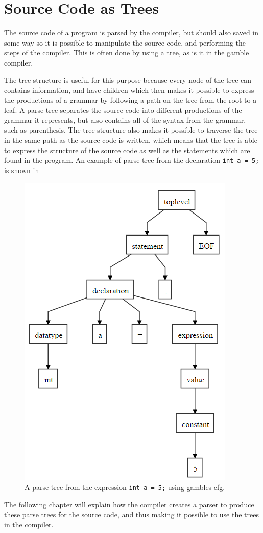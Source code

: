 \section{Source Code as Trees}\label{SourceCodeAsTrees}
The source code of a program is parsed by the compiler, but should also saved in some way so it is possible to manipulate the source code, and performing the steps of the compiler.
This is often done by using a tree, as is it in the \gls{gamble} compiler.

The tree structure is useful for this purpose because every node of the tree can contains information, and have children which then makes it possible to express the productions of a grammar by following a path on the tree from the root to a leaf.
A parse tree separates the source code into different productions of the grammar it represents, but also contains all of the syntax from the grammar, such as parenthesis.
The tree structure also makes it possible to traverse the tree in the same path as the source code is written, which means that the tree is able to express the structure of the source code as well as the statements which are found in the program.
An example of parse tree from the declaration \texttt{int a = 5;} is shown in 

\begin{figure}
    \centering
    \includegraphics[width=0.5\linewidth]{figures/Trees/PST.PNG}
    \caption{A parse tree from the expression \texttt{int a = 5;} using \glspl{gamble} \acrshort{cfg}.} \label{image:PST}
\end{figure}

The following chapter will explain how the compiler creates a parser to produce these parse trees for the source code, and thus making it possible to use the trees in the compiler.
